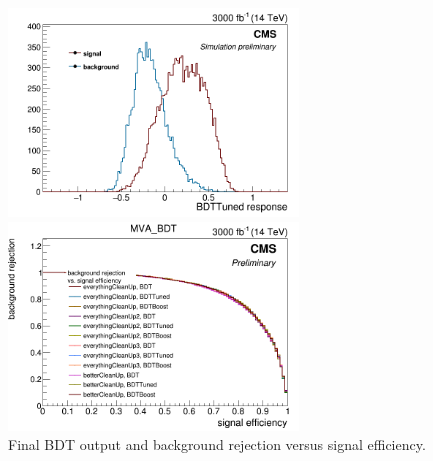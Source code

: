 \documentclass[10pt,a4paper]{article}
\newcommand{\ww}{7.7cm} %
\begin{document}
\begin{figure}[h] 
	
    \begin{minipage}[h!]{\ww}
      \centering
      \includegraphics[width=\ww]{figs/BDTTuned_everythingCleanUp.png}
    \end{minipage}
    \begin{minipage}[h!]{\ww}
      \centering
      \includegraphics[width=\ww]{figs/BrejvsSeffs_everythingCleanUp_BDTTuned.png}
    \end{minipage}
  \caption{Final BDT output and background rejection versus signal efficiency.} \label{BDT}

\end{figure}
\end{document}
